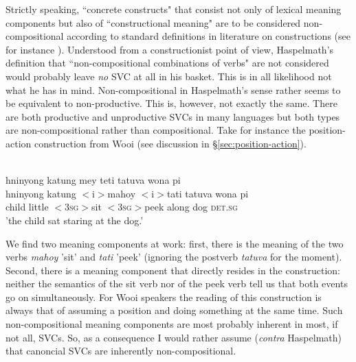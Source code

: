 Strictly speaking, ``concrete constructs" that consist not only of lexical meaning components but also of ``constructional meaning" are to be considered non-compositional according to standard definitions in literature on constructions (see for instance \citealt{goldberg1995constructions, goldberg2006constructions, croft2001radical}). Understood from a constructionist point of view, Haspelmath's definition that ``non-compositional combinations of verbs" are not considered would probably leave \emph{no} SVC at all in his basket. This is in all likelihood not what he has in mind. Non-compositional in Haspelmath's sense rather seems to be equivalent to non-productive. This is, however, not exactly the same. There are both productive and unproductive SVCs in many languages but both types are non-compositional rather than compositional. Take for instance the position-action construction from Wooi (see discussion in §\ref{sec:position-action}).

\ea \label{}
\\
\glll hninyong katung mey teti tatuva wona pi \\
hninyong katung $<$i$>$mahoy $<$i$>$tati tatuva wona pi \\
 child little $<$\textsc{3}\textsc{sg}$>$sit $<$\textsc{3}\textsc{sg}$>$peek along dog \textsc{det}.\textsc{sg} \\
\glft 'the child sat staring at the dog.'\\ 
\z

We find two meaning components at work: first, there is the meaning of the two verbs \textit{mahoy} 'sit' and \textit{tati} 'peek' (ignoring the postverb \textit{tatuva} for the moment). Second, there is a meaning component that directly resides in the construction: neither the semantics of the sit verb nor of the peek verb tell us that both events go on simultaneously. For Wooi speakers the reading of this construction is always that of assuming a position and doing something at the same time. Such non-compositional meaning components are most probably inherent in most, if not all, SVCs. So, as a consequence I would rather assume (\textit{contra} Haspelmath) that canoncial SVCs are inherently non-compositional.

